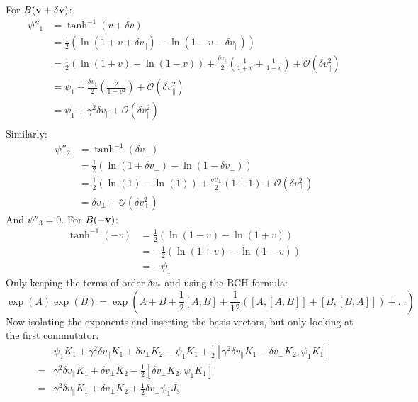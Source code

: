 \documentclass[12pt,a4]{article}
\begin{document}
        For $B({\bf v + \delta v})$:
        \begin{align*}
          \psi''_1 &= \tanh^{-1}(v + \delta v) \\
                  &= \frac{1}{2}\left(\ln(1 + v + \delta v_\parallel) - \ln(1 - v - \delta v_\parallel)\right)\\
                  &= \frac{1}{2}\left(\ln(1 + v) - \ln(1 - v)\right) + \frac{\delta v_\parallel}{2}\left(\frac{1}{1 + v} + \frac{1}{1 - v}\right) + \mathcal{O}(\delta v_\parallel^2)\\
                  &= \psi_1 + \frac{\delta v_\parallel}{2}\left(\frac{2}{1 - v^2}\right) + \mathcal{O}(\delta v_\parallel^2)\\
                  &= \psi_1 + \gamma^2 \delta v_\parallel + \mathcal{O}(\delta v_\parallel^2)\\
        \end{align*}
        Similarly:
        \begin{align*}
          \psi''_2 &= \tanh^{-1}(\delta v_\perp) \\
                  &= \frac{1}{2}\left(\ln(1 + \delta v_\perp) - \ln(1 - \delta v_\perp)\right)\\
                  &= \frac{1}{2}\left(\ln(1) - \ln(1)\right) + \frac{\delta v_\perp}{2}\left(1 + 1\right) + \mathcal{O}(\delta v_\perp^2)\\
                  &= \delta v_\perp + \mathcal{O}(\delta v_\perp^2)
        \end{align*}
        And $\psi''_3 = 0$.
        For $B(-{\bf v})$:
        \begin{align*}
          \tanh^{-1}(-v )
                  &= \frac{1}{2}\left(\ln(1 - v ) - \ln(1 + v )\right)\\
                  &= - \frac{1}{2}\left(\ln(1 + v ) - \ln(1 - v )\right)\\
                  &= - \psi_1
        \end{align*}
        Only keeping the terms of order $\delta v_*$ and using the BCH formula:
        \begin{equation*}
          \exp (A) \exp(B) = \exp(A + B + \frac{1}{2}[A, B] + \frac{1}{12}\left([A, [A, B]] + [B, [B, A]]\right) + ...)
        \end{equation*}
        Now isolating the exponents and inserting the basis vectors, but only looking at the first commutator:
        \begin{align*}
          &\psi_1 K_1 + \gamma^2 \delta v_\parallel K_1 + \delta v_\perp K_2 - \psi_1 K_1 + \frac{1}{2} \left[\gamma^2 \delta v_\parallel K_1 - \delta v_\perp K_2, \psi_1 K_1\right]\\
          =&  \gamma^2\delta v_\parallel K_1 +  \delta v_\perp K_2  - \frac{1}{2} \left[ \delta v_\perp K_2, \psi_1 K_1\right]\\
          =&  \gamma^2\delta v_\parallel K_1 +  \delta v_\perp K_2  + \frac{1}{2} \delta v_\perp \psi_1 J_3
        \end{align*}
\end{document}
